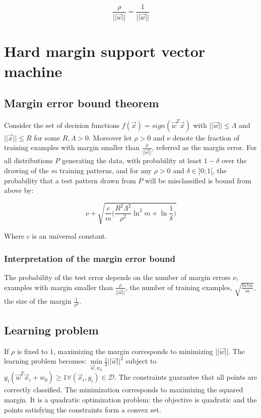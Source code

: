 	$$\frac{\rho}{||\vec{w}||} = \frac{1}{||\vec{w}||}$$

\section{Hard margin support vector machine}

	\subsection{Margin error bound theorem}
	Consider the set of decision functions $f(\vec{x}) = sign(\vec{w}^T\vec{x})$ with $||\vec{w}||\le\Lambda$ and $||\vec{x}||\le R$ for some $R, \Lambda > 0$.
	Moreover let $\rho>0$ and $\nu$ denote the fraction of training examples with margin smaller than $\frac{\rho}{||\vec{w}||}$, referred as the margin error.
	For all distributions $P$ generating the data, with probability at least $1-\delta$ over the drawing of the $m$ training patterns, and for any $\rho>0$ and $\delta\in]0;1[$, the probability that a test pattern drawn from $P$ will be misclassified is bound from above by:

	$$\nu+\sqrt{\frac{c}{m}\biggl(\frac{R^2\Lambda^2}{\rho^2}\ln^2m+\ln\frac{1}{\delta}\biggr)}$$

	Where $c$ is an universal constant.

		\subsubsection{Interpretation of the margin error bound}
		The probability of the test error depends on the number of margin errors $\nu$, examples with margin smaller than $\frac{\rho}{||\vec{w}||}$, the number of training examples, $\sqrt{\frac{ln^2m}{m}}$, the size of the margin $\frac{1}{\rho^2}$.

	\subsection{Learning problem}
	If $\rho$ is fixed to $1$, maximizing the margin corresponds to minimizing $||\vec{w}||$.
	The learning problem becomes: $\min\limits_{\vec{w}, w_0} \frac{1}{2}||\vec{w}||^2$ subject to $y_i(\vec{w}^T\vec{x}_i+w_0)\ge 1\forall(\vec{x}_i, y_i)\in\mathcal{D}$.
	The constraints guarantee that all points are correctly classified.
	The minimization corresponds to maximizing the squared margin.
	It is a quadratic optimization problem: the objective is quadratic and the points satisfying the constraints form a convex set.

